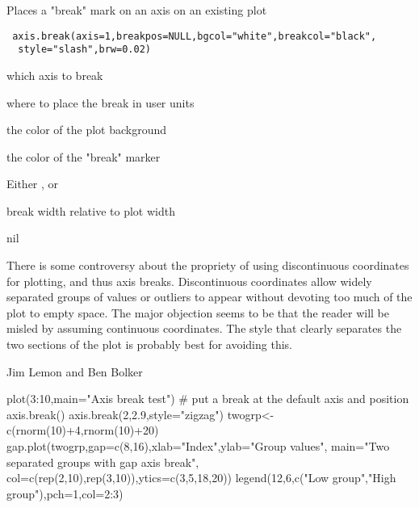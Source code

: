 \begin{Description}\relax
Places a "break" mark on an axis on an existing plot
\end{Description}
\begin{Usage}
\begin{verbatim}
 axis.break(axis=1,breakpos=NULL,bgcol="white",breakcol="black",
  style="slash",brw=0.02)
\end{verbatim}
\end{Usage}
\begin{Arguments}
\begin{ldescription}
\item[\code{axis}] which axis to break
\item[\code{breakpos}] where to place the break in user units
\item[\code{bgcol}] the color of the plot background
\item[\code{breakcol}] the color of the "break" marker
\item[\code{style}] Either ,  or 
\item[\code{brw}] break width relative to plot width
\end{ldescription}
\end{Arguments}
\begin{Value}
nil
\end{Value}
\begin{Note}\relax
There is some controversy about the propriety of using discontinuous
coordinates for plotting, and thus axis breaks. Discontinuous coordinates
allow widely separated groups of values or outliers to appear without
devoting too much of the plot to empty space. The major objection seems 
to be that the reader will be misled by assuming continuous coordinates.
The  style that clearly separates the two sections of the plot
is probably best for avoiding this.
\end{Note}
\begin{Author}\relax
Jim Lemon and Ben Bolker
\end{Author}
\begin{SeeAlso}\relax
{}
\end{SeeAlso}
\begin{Examples}
\begin{ExampleCode}
 plot(3:10,main="Axis break test")
 # put a break at the default axis and position
 axis.break()
 axis.break(2,2.9,style="zigzag")
 twogrp<-c(rnorm(10)+4,rnorm(10)+20)
 gap.plot(twogrp,gap=c(8,16),xlab="Index",ylab="Group values",
  main="Two separated groups with gap axis break",
  col=c(rep(2,10),rep(3,10)),ytics=c(3,5,18,20))
 legend(12,6,c("Low group","High group"),pch=1,col=2:3)
\end{ExampleCode}
\end{Examples}

